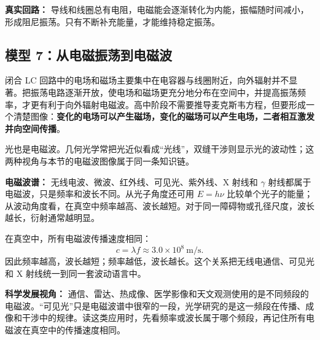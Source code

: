 \begin{center}


\label{fig:lc-oscillation}
\end{center}

\textbf{真实回路：} 导线和线圈总有电阻，电磁能会逐渐转化为内能，振幅随时间减小，形成阻尼振荡。只有不断补充能量，才能维持稳定振荡。

\subsection*{模型 7：从电磁振荡到电磁波}

闭合 LC 回路中的电场和磁场主要集中在电容器与线圈附近，向外辐射并不显著。把振荡电路逐渐开放，使电场和磁场更充分地分布在空间中，并提高振荡频率，才更有利于向外辐射电磁波。高中阶段不需要推导麦克斯韦方程，但要形成一个清楚图像：\textbf{变化的电场可以产生磁场，变化的磁场可以产生电场，二者相互激发并向空间传播}。

\begin{center}


\label{fig:electromagnetic-wave-bridge}
\end{center}

光也是电磁波。几何光学常把光近似看成“光线”，双缝干涉则显示光的波动性；这两种视角与本节的电磁波图像属于同一条知识链。

\textbf{电磁波谱：} 无线电波、微波、红外线、可见光、紫外线、X 射线和 $\gamma$ 射线都属于电磁波，只是频率和波长不同。从光子角度还可用 $E=h\nu$ 比较单个光子的能量；从波动角度看，在真空中频率越高、波长越短。对于同一障碍物或孔径尺度，波长越长，衍射通常越明显。

在真空中，所有电磁波传播速度相同：
\[
c=\lambda f\approx3.0\times10^8\ \mathrm{m/s}.
\]
因此频率越高，波长越短；频率越低，波长越长。这个关系把无线电通信、可见光和 X 射线统一到同一套波动语言中。

\begin{center}


\label{fig:em-spectrum}
\end{center}

\textbf{科学发展视角：} 通信、雷达、热成像、医学影像和天文观测使用的是不同频段的电磁波。“可见光”只是电磁波谱中很窄的一段，光学研究的是这一频段在传播、成像和干涉中的规律。读这类应用时，先看频率或波长属于哪个频段，再记住所有电磁波在真空中的传播速度相同。

